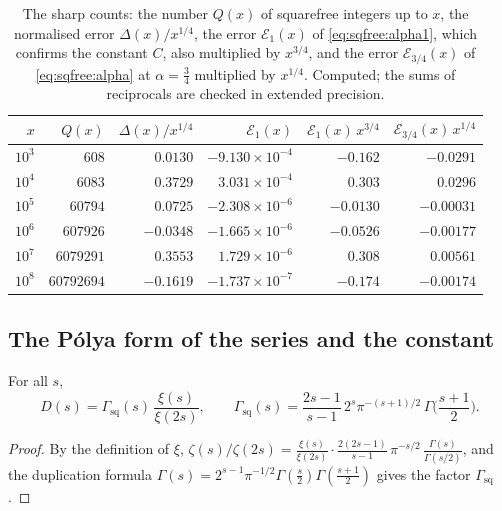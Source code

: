 \begin{table}[htbp]
\centering\small
\begin{tabular}{rrrrrr}
\toprule
$x$ & $Q(x)$ & $\Delta(x)/x^{1/4}$ & $\mathcal E_1(x)$ & $\mathcal E_1(x)\,x^{3/4}$ & $\mathcal E_{3/4}(x)\,x^{1/4}$\\
\midrule
$10^3$ & $608$ & $0.0130$ & $-9.130\times10^{-4}$ & $-0.162$ & $-0.0291$\\
$10^4$ & $6083$ & $0.3729$ & $3.031\times10^{-4}$ & $0.303$ & $0.0296$\\
$10^5$ & $60794$ & $0.0725$ & $-2.308\times10^{-6}$ & $-0.0130$ & $-0.00031$\\
$10^6$ & $607926$ & $-0.0348$ & $-1.665\times10^{-6}$ & $-0.0526$ & $-0.00177$\\
$10^7$ & $6079291$ & $0.3553$ & $1.729\times10^{-6}$ & $0.308$ & $0.00561$\\
$10^8$ & $60792694$ & $-0.1619$ & $-1.737\times10^{-7}$ & $-0.174$ & $-0.00174$\\
\bottomrule
\end{tabular}
\caption{The sharp counts: the number $Q(x)$ of squarefree integers up to $x$, the normalised error $\Delta(x)/x^{1/4}$, the error $\mathcal E_1(x)$ of \eqref{eq:sqfree:alpha1}, which confirms the constant $C$, also multiplied by $x^{3/4}$, and the error $\mathcal E_{3/4}(x)$ of \eqref{eq:sqfree:alpha} at $\alpha=\frac34$ multiplied by $x^{1/4}$. Computed; the sums of reciprocals are checked in extended precision.}
\label{tab:sqfree:sharp}
\end{table}

\subsection{The P\'olya form of the series and the constant}\label{sec:sqfree:polya}

\begin{lemma}\label{lem:sqfree:gamma}
For all $s$,
\[
D(s)=\Gamma_{\mathrm{sq}}(s)\,\frac{\xi(s)}{\xi(2s)},\qquad \Gamma_{\mathrm{sq}}(s)=\frac{2s-1}{s-1}\,2^s\pi^{-(s+1)/2}\,\Gamma\Big(\frac{s+1}2\Big).
\]
\end{lemma}

\begin{proof}
By the definition of $\xi$, $\zeta(s)/\zeta(2s)=\frac{\xi(s)}{\xi(2s)}\cdot\frac{2(2s-1)}{s-1}\,\pi^{-s/2}\,\frac{\Gamma(s)}{\Gamma(s/2)}$, and the duplication formula $\Gamma(s)=2^{s-1}\pi^{-1/2}\Gamma(\frac s2)\Gamma(\frac{s+1}2)$ gives the factor $\Gamma_{\mathrm{sq}}$.
\end{proof}

